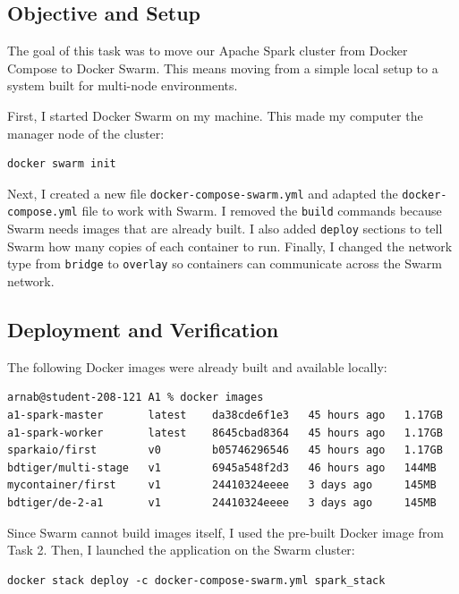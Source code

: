 \documentclass[11pt,a4paper]{article}
\begin{document}
\subsection{Objective and Setup}
The goal of this task was to move our Apache Spark cluster from Docker Compose to Docker Swarm. This means moving from a simple local setup to a system built for multi-node environments.

First, I started Docker Swarm on my machine. This made my computer the manager node of the cluster:
\begin{lstlisting}[style=shell]
docker swarm init  
\end{lstlisting}

Next, I created a new file \texttt{docker-compose-swarm.yml} and adapted the \texttt{docker-compose.yml} file to work with Swarm. I removed the \texttt{build} commands because Swarm needs images that are already built. I also added \texttt{deploy} sections to tell Swarm how many copies of each container to run. Finally, I changed the network type from \texttt{bridge} to \texttt{overlay} so containers can communicate across the Swarm network.



\subsection{Deployment and Verification}
The following Docker images were already built and available locally:
\begin{lstlisting}[style=shell]
arnab@student-208-121 A1 % docker images                                              
a1-spark-master       latest    da38cde6f1e3   45 hours ago   1.17GB
a1-spark-worker       latest    8645cbad8364   45 hours ago   1.17GB
sparkaio/first        v0        b05746296546   45 hours ago   1.17GB
bdtiger/multi-stage   v1        6945a548f2d3   46 hours ago   144MB
mycontainer/first     v1        24410324eeee   3 days ago     145MB
bdtiger/de-2-a1       v1        24410324eeee   3 days ago     145MB     
\end{lstlisting}

Since Swarm cannot build images itself, I used the pre-built Docker image from Task 2. Then, I launched the application on the Swarm cluster:
\begin{lstlisting}[style=shell]
docker stack deploy -c docker-compose-swarm.yml spark_stack
\end{lstlisting}
\end{document}
